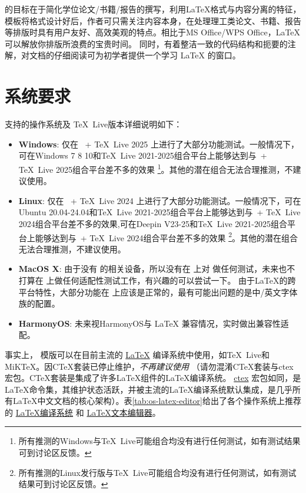\projectname 的目标在于简化学位论文/书籍/报告的撰写，利用\LaTeX{}格式与内容分离的特征，模板将格式设计好后，作者可只需关注内容本身，在处理理工类论文、书籍、报告等排版时具有用户友好、高效美观的特点。相比于MS Office/WPS Office，\LaTeX{}可以解放你排版所浪费的宝贵时间。 同时，\projectname 有着整洁一致的代码结构和扼要的注解，对文档的仔细阅读可为初学者提供一个学习 \LaTeX{} 的窗口。

\section{系统要求}\label{sec:system}

支持的操作系统及 \TeX~Live版本详细说明如下：
\begin{itemize}
\item \textbf{Windows}:  \project 仅在 \projectwindows~+ \TeX~Live 2025 上进行了大部分功能测试。一般情况下，可在Windows 7 8 10和\TeX~Live 2021-2025组合平台上能够达到与\projectwindows~+ \TeX~Live 2025组合平台差不多的效果 \footnote{所有推测的Windows与\TeX~Live可能组合均没有进行任何测试，如有测试结果可到讨论区反馈。}。其他的潜在组合无法合理推测，不建议使用。

\item \textbf{Linux}:  \project 仅在  \projectlinux~+ \TeX~Live 2024 上进行了大部分功能测试。一般情况下，可在Ubuntu 20.04-24.04和\TeX~Live 2021-2025组合平台上能够达到与\projectlinux~+ \TeX~Live 2024组合平台差不多的效果,可在Deepin V23-25和\TeX~Live 2021-2025组合平台上能够达到与\projectlinux~+ \TeX~Live 2024组合平台差不多的效果 \footnote{所有推测的Linux发行版与\TeX~Live可能组合均没有进行任何测试，如有测试结果可到讨论区反馈。}。其他的潜在组合无法合理推测，不建议使用。

\item \textbf{MacOS X}:  由于没有 \projectmacos 的相关设备，所以没有在 \projectmacos 上对 \project 做任何测试，未来也不打算在 \projectmacos 上做任何适配性测试工作，有兴趣的可以尝试一下。 由于\LaTeX{}的跨平台特性，大部分功能在 \projectmacos 上应该是正常的，最有可能出问题的是中/英文字体族的配置。

\item \textbf{HarmonyOS}:  未来视HarmonyOS与 \LaTeX{} 兼容情况，实时做出兼容性适配。
\end{itemize}

事实上，
\href{https://github.com/changbozhu/\projectname}{\projectname} 模版可以在目前主流的 \href{https://en.wikibooks.org/wiki/LaTeX/Introduction}{\LaTeX{}} 编译系统中使用，如\TeX{}~Live和MiK\TeX{}。因C\TeX{}套装已停止维护，\emph{不再建议使用} （请勿混淆C\TeX{}套装与ctex宏包。C\TeX{}套装是集成了许多\LaTeX{}组件的\LaTeX{}编译系统。 \href{https://ctan.org/pkg/ctex?lang=en}{ctex} 宏包如同\projectname ，是\LaTeX{}命令集，其维护状态活跃，并被主流的\LaTeX{}编译系统默认集成，是几乎所有\LaTeX{}中文文档的核心架构）。表\ref{tab:os-latex-editor}给出了各个操作系统上推荐的 \href{https://en.wikibooks.org/wiki/LaTeX/Installation}{\LaTeX{}编译系统} 和 \href{https://en.wikibooks.org/wiki/LaTeX/Installation}{\LaTeX{}文本编辑器}。

